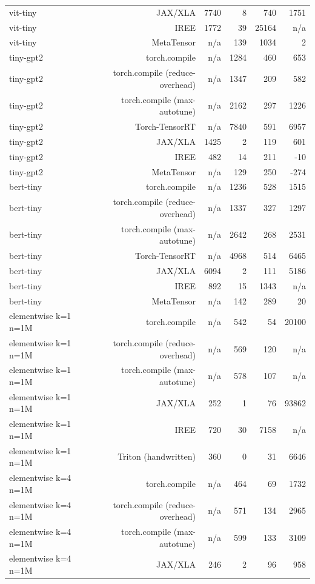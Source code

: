 \begin{tabular}{lrrrrr}
vit-tiny & JAX/XLA & 7740 & 8 & 740 & 1751 \\
vit-tiny & IREE & 1772 & 39 & 25164 & n/a \\
vit-tiny & MetaTensor & n/a & 139 & 1034 & 2 \\
tiny-gpt2 & torch.compile & n/a & 1284 & 460 & 653 \\
tiny-gpt2 & torch.compile (reduce-overhead) & n/a & 1347 & 209 & 582 \\
tiny-gpt2 & torch.compile (max-autotune) & n/a & 2162 & 297 & 1226 \\
tiny-gpt2 & Torch-TensorRT & n/a & 7840 & 591 & 6957 \\
tiny-gpt2 & JAX/XLA & 1425 & 2 & 119 & 601 \\
tiny-gpt2 & IREE & 482 & 14 & 211 & -10 \\
tiny-gpt2 & MetaTensor & n/a & 129 & 250 & -274 \\
bert-tiny & torch.compile & n/a & 1236 & 528 & 1515 \\
bert-tiny & torch.compile (reduce-overhead) & n/a & 1337 & 327 & 1297 \\
bert-tiny & torch.compile (max-autotune) & n/a & 2642 & 268 & 2531 \\
bert-tiny & Torch-TensorRT & n/a & 4968 & 514 & 6465 \\
bert-tiny & JAX/XLA & 6094 & 2 & 111 & 5186 \\
bert-tiny & IREE & 892 & 15 & 1343 & n/a \\
bert-tiny & MetaTensor & n/a & 142 & 289 & 20 \\
elementwise k=1 n=1M & torch.compile & n/a & 542 & 54 & 20100 \\
elementwise k=1 n=1M & torch.compile (reduce-overhead) & n/a & 569 & 120 & n/a \\
elementwise k=1 n=1M & torch.compile (max-autotune) & n/a & 578 & 107 & n/a \\
elementwise k=1 n=1M & JAX/XLA & 252 & 1 & 76 & 93862 \\
elementwise k=1 n=1M & IREE & 720 & 30 & 7158 & n/a \\
elementwise k=1 n=1M & Triton (handwritten) & 360 & 0 & 31 & 6646 \\
elementwise k=4 n=1M & torch.compile & n/a & 464 & 69 & 1732 \\
elementwise k=4 n=1M & torch.compile (reduce-overhead) & n/a & 571 & 134 & 2965 \\
elementwise k=4 n=1M & torch.compile (max-autotune) & n/a & 599 & 133 & 3109 \\
elementwise k=4 n=1M & JAX/XLA & 246 & 2 & 96 & 958 \\

\end{tabular}

